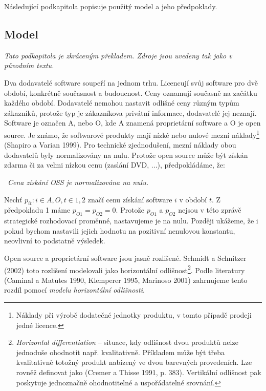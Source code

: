 \begin{multicols}{2}
	Následující podkapitola popisuje použitý model a jeho předpoklady.

	\subsection{Model}
	{\em Tato podkapitola je zkráceným překladem. Zdroje jsou uvedeny tak jako v původním textu.}

	Dva dodavatelé software soupeří na jednom trhu. Licencují svůj software pro dvě období, konkrétně současnost a budoucnost. Ceny oznamují současně na začátku každého období. Dodavatelé nemohou nastavit odlišné ceny různým typům zákazníků, protože typ je zákazníkova privátní informace, dodavatelé jej neznají. Software je označen A, nebo O, kde A znamená proprietární software a O je open source. Je známo, že softwarové produkty mají nízké nebo nulové mezní náklady\footnote{Náklady při výrobě dodatečné jednotky produktu, v tomto případě prodeji jedné licence.} (Shapiro a Varian 1999). Pro technické zjednodušení, mezní náklady obou dodavatelů byly normalizovány na nulu. Protože open source může být získán zdarma či za velmi nízkou cenu (zaslání DVD, ...), předpokládáme, že:

	\vspace{10pt}
	~{\em Cena získání OSS je normalizována na nulu.}
	\vspace{10pt}

	Nechť $p_{it}: i \in {A,O}, t \in {1,2}$ značí cenu získání software $i$ v období $t$. Z předpokladu 1 máme $p_{O1} = p_{O2} = 0$. Protože $p_{O1}$ a $p_{O2}$ nejsou v této zprávě strategické rozhodovací proměnné, nastavujeme je na nulu. Později ukážeme, že i pokud bychom nastavili jejich hodnotu na pozitivní nenulovou konstantu, neovlivní to podstatně výsledek.

	Open source a proprietární software jsou jasně rozlišené. Schmidt a Schnitzer (2002) toto rozlišení modelovali jako horizontální odlišnost\footnote{{\em Horizontal differentiation} -- situace, kdy odlišnost dvou produktů nelze jednoduše ohodnotit např. kvalitativně. Příkladem může být třeba kvalitativně totožný produkt nabízený ve dvou barevných provedeních. Lze rovněž definovat jako {\em{}} (Cremer a Thisse 1991, p. 383). Vertikální odlišnost pak poskytuje jednoznačně ohodnotitelné a uspořádatelné srovnání.}. Podle literatury (Caminal a Matutes 1990, Klemperer 1995, Marinoso 2001) zahrnujeme tento rozdíl pomocí {\em modelu horizontální odlišnosti}.


\end{multicols}
